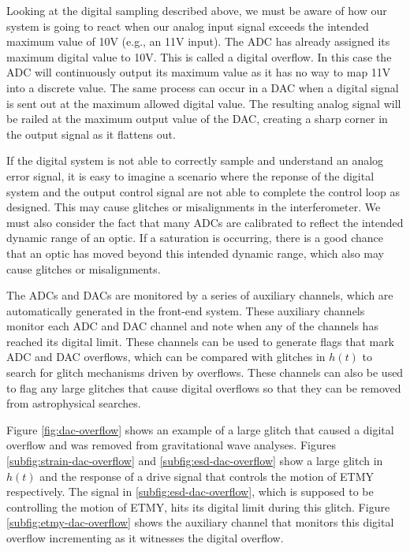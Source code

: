 Looking at the digital sampling described above, we must be aware of how our system 
is going to react when our analog input signal exceeds the intended maximum 
value of 10V (e.g., an 11V input). The ADC has already assigned its maximum 
digital value to 10V. This is called a digital overflow. In this case the ADC 
will continuously output its maximum value as it has no way to map 11V into 
a discrete value. The same process can occur in a DAC when a digital signal 
is sent out at the maximum allowed digital value. The resulting analog signal 
will be railed at the maximum output value of the DAC, creating a sharp corner 
in the output signal as it flattens out. 

If the digital system is not able to correctly sample and understand an analog 
error signal, it is easy to imagine a scenario where the reponse of the digital 
system and the output control signal are not able to complete the control loop 
as designed. This may cause glitches or misalignments in the interferometer.
We must also consider the fact that many ADCs are calibrated to reflect the 
intended dynamic range of an optic.  If a saturation is occurring, there is 
a good chance that an optic has moved beyond this intended dynamic range, which 
also may cause glitches or misalignments.

The ADCs and DACs are monitored by a series of auxiliary channels, which are 
automatically generated in the front-end system. These auxiliary channels 
monitor each ADC and DAC channel and note when any of the channels has reached 
its digital limit. These channels can be used to generate flags that mark 
ADC and DAC overflows, which can be compared with glitches in $h(t)$ to 
search for glitch mechanisms driven by overflows. These channels can also 
be used to flag any large glitches that cause digital overflows so that they 
can be removed from astrophysical searches. 

Figure \ref{fig:dac-overflow} shows an example of a large glitch that caused 
a digital overflow and was removed from gravitational wave analyses. Figures 
\ref{subfig:strain-dac-overflow} and \ref{subfig:esd-dac-overflow} show a 
large glitch in $h(t)$ and the response of a drive signal that controls 
the motion of ETMY respectively. The signal in \ref{subfig:esd-dac-overflow}, 
which is supposed to be controlling the motion of ETMY, hits its digital 
limit during this glitch. Figure \ref{subfig:etmy-dac-overflow} shows the 
auxiliary channel that monitors this digital overflow incrementing as 
it witnesses the digital overflow. 

